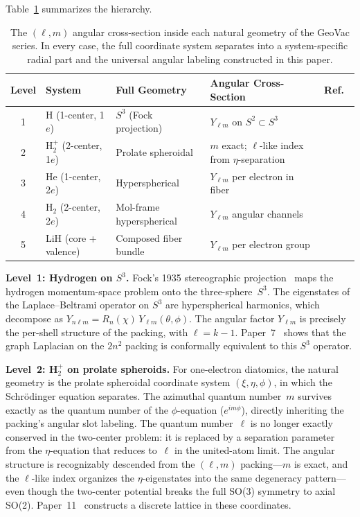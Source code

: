 \documentclass[aps,prl,reprint,amsmath,amssymb]{revtex4-2}
\begin{document}
Table~\ref{tab:cross-section} summarizes the hierarchy.

\begin{table}[h]
\centering
\begin{tabular}{cllll}
\toprule
Level & System & Full Geometry & Angular Cross-Section & Ref.\ \\
\midrule
1 & H (1-center, 1$e$)
  & $S^3$ (Fock projection)
  & $Y_{\ell m}$ on $S^2 \subset S^3$
  & \cite{paper7} \\
2 & H$_2^+$ (2-center, 1$e$)
  & Prolate spheroidal
  & $m$ exact; $\ell$-like index from $\eta$-separation
  & \cite{paper11} \\
3 & He (1-center, 2$e$)
  & Hyperspherical
  & $Y_{\ell m}$ per electron in fiber
  & \cite{paper13} \\
4 & H$_2$ (2-center, 2$e$)
  & Mol-frame hyperspherical
  & $Y_{\ell m}$ angular channels
  & \cite{paper15} \\
5 & LiH (core + valence)
  & Composed fiber bundle
  & $Y_{\ell m}$ per electron group
  & \cite{paper17} \\
\bottomrule
\end{tabular}
\caption{The $(\ell, m)$ angular cross-section inside each natural
  geometry of the GeoVac series.  In every case, the full coordinate
  system separates into a system-specific radial part and the
  universal angular labeling constructed in this paper.}
\label{tab:cross-section}
\end{table}

\textbf{Level~1: Hydrogen on $S^3$.}
Fock's 1935 stereographic projection~\cite{fock1935} maps the hydrogen
momentum-space problem onto the three-sphere~$S^3$.  The eigenstates
of the Laplace--Beltrami operator on $S^3$ are hyperspherical
harmonics, which decompose as $Y_{n\ell m} = R_n(\chi) \,
Y_{\ell m}(\theta, \phi)$.  The angular factor $Y_{\ell m}$ is
precisely the per-shell structure of the packing, with $\ell = k - 1$.
Paper~7~\cite{paper7} shows that the graph Laplacian on the $2n^2$
packing is conformally equivalent to this $S^3$ operator.

\textbf{Level~2: H$_2^+$ on prolate spheroids.}
For one-electron diatomics, the natural geometry is the prolate
spheroidal coordinate system $(\xi, \eta, \phi)$, in which the
Schr\"odinger equation separates.  The azimuthal quantum number~$m$
survives exactly as the quantum number of the $\phi$-equation
($e^{im\phi}$), directly inheriting the packing's angular slot
labeling.  The quantum number~$\ell$ is no longer exactly conserved in
the two-center problem: it is replaced by a separation parameter from
the $\eta$-equation that reduces to~$\ell$ in the united-atom limit.
The angular structure is recognizably descended from the $(\ell, m)$
packing---$m$ is exact, and the $\ell$-like index organizes the
$\eta$-eigenstates into the same degeneracy pattern---even though the
two-center potential breaks the full SO(3) symmetry to axial SO(2).
Paper~11~\cite{paper11} constructs a discrete lattice in these
coordinates.
\end{document}

